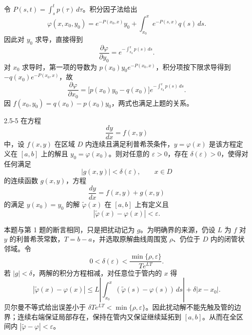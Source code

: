 \documentclass[UTF8,a4paper,11pt]{ctexart}
\begin{document}
\begin{solution}
令 $P(s,t)=\int_s^t p(\tau)\,d\tau$。积分因子法给出
\[
\varphi(x,x_0,y_0)=e^{-P(x_0,x)}y_0
+\int_{x_0}^{x}e^{-P(s,x)}q(s)\,ds.
\]
因此对 $y_0$ 求导，直接得到
\[
\boxed{\frac{\partial\varphi}{\partial y_0}=e^{-\int_{x_0}^x p(s)\,ds}}.
\]
对 $x_0$ 求导时，第一项的导数为 $p(x_0)y_0e^{-P(x_0,x)}$，积分项按下限求导得到 $-q(x_0)e^{-P(x_0,x)}$，故
\[
\boxed{\frac{\partial\varphi}{\partial x_0}
=\bigl[p(x_0)y_0-q(x_0)\bigr]e^{-\int_{x_0}^x p(s)\,ds}}.
\]
因 $f(x_0,y_0)=q(x_0)-p(x_0)y_0$，两式也满足上题的关系。
\end{solution}

\begin{problem}{2.5-5}
在方程
  \[
    \frac{dy}{dx}=f(x,y)
  \]
  中，设 $f(x,y)$ 在区域 $D$ 内连续且满足利普希茨条件，$y=\varphi(x)$ 是该方程定义在 $[a,b]$ 上的解且 $y_0=\varphi(x_0)$。则对任意的 $\varepsilon>0$，存在 $\delta(\varepsilon)>0$，使得对任何满足
  \[
    |g(x,y)|<\delta(\varepsilon),\qquad x\in D
  \]
  的连续函数 $g(x,y)$，方程
  \[
    \frac{dy}{dx}=f(x,y)+g(x,y)
  \]
  的满足 $y(x_0)=y_0$ 的解 $\widetilde{\varphi}(x)$ 在 $[a,b]$ 上有定义且
  \[
    |\widetilde{\varphi}(x)-\varphi(x)|<\varepsilon.
  \]
\end{problem}

\begin{solution}
本题与第 1 题的断言相同，只是把扰动记为 $g$。为明确界的来源，仍设 $L$ 为 $f$ 对 $y$ 的利普希茨常数，$T=b-a$，并选取原解曲线周围宽 $\rho$、仍位于 $D$ 内的闭管状邻域。令
\[
0<\delta(\varepsilon)<\frac{\min\{\rho,\varepsilon\}}{T e^{LT}}.
\]
若 $|g|<\delta$，两解的积分方程相减，对任意位于管内的 $x$ 得
\[
|\widetilde\varphi(x)-\varphi(x)|
\le L\left|\int_{x_0}^x(\widetilde\varphi(s)-\varphi(s))\,ds\right|
+\delta|x-x_0|.
\]
贝尔曼不等式给出误差小于 $\delta T e^{LT}<\min\{\rho,\varepsilon\}$。因此扰动解不能先触及管的边界；连续右端保证局部存在，保持在管内又保证继续延拓到 $[a,b]$。从而在全区间内 $\boxed{|\widetilde\varphi-\varphi|<\varepsilon}$。
\end{solution}
\end{document}
